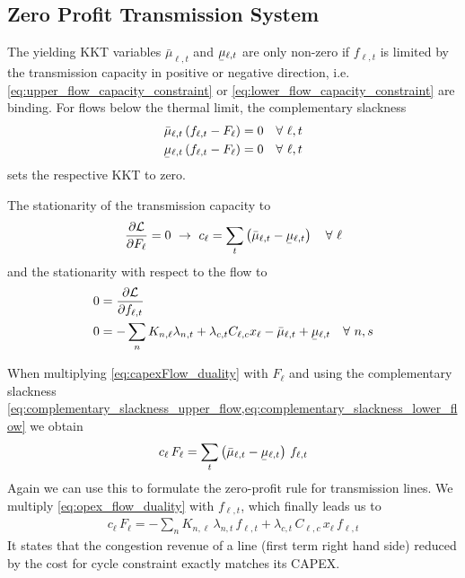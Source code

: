 \documentclass[11pt,twocolumn]{article}
\newcommand{\ubar}[1]{\underaccent{\bar}{#1}}
\newcommand{\Forall}[1]{\hspace{10pt} \forall \,\, #1 }
\newcommand{\pdv}[2]{\frac{\partial #1}{\partial #2}}
\newcommand{\flow}{f_{\ell,t}}
\newcommand{\capacityflow}{F_{\ell}}
\newcommand{\capitalpriceflow}{c_{\ell}}
\newcommand{\mulowerflow}{\ubar{\mu}_{\ell,t}}
\newcommand{\muupperflow}{\bar{\mu}_{\ell,t}}
\newcommand{\lagrangian}{\mathcal{L}}
\newcommand{\lmp}[1][n]{\lambda_{#1,t}}
\newcommand{\incidence}[1][n]{K_{#1,\ell}}
\newcommand{\cycle}{C_{\ell,c}}
\newcommand{\impedance}{x_\ell}
\newcommand{\cycleprice}{\lambda_{c,t}}
\begin{document}
\subsection{Zero Profit Transmission System}
\label{sec:zero_profit_flow}

The yielding KKT variables $\muupperflow$ and $\mulowerflow$ are only non-zero if $\flow$ is limited by the transmission capacity in positive or negative direction, i.e. \cref{eq:upper_flow_capacity_constraint} or \cref{eq:lower_flow_capacity_constraint} are binding. For flows below the thermal limit, the complementary slackness 
\begin{align}
\muupperflow \left( \flow - \capacityflow \right)  &= 0 \Forall{\ell,t}
\label{eq:complementary_slackness_upper_flow} \\
\mulowerflow \left( \flow - \capacityflow \right) &=  0 \Forall{\ell,t}
\label{eq:complementary_slackness_lower_flow} 
\end{align}
sets the respective KKT to zero. 

The stationarity of the transmission capacity to
\begin{align}
\pdv{\lagrangian}{\capacityflow} = 0 \,\, \rightarrow \,\, 
\capitalpriceflow =  \sum_t \left( \muupperflow - \mulowerflow \right) \Forall{\ell}
\label{eq:capexFlow_duality}
\end{align}
and the stationarity with respect to the flow to
\begin{align}
    0 &= \pdv{\lagrangian}{\flow}  \\ 
    0 &= - \sum_n \incidence \lmp  + \cycleprice \cycle \impedance  - \muupperflow + \mulowerflow \Forall{n,s} \label{eq:opex_flow_duality}
\end{align}
    
    
When multiplying \cref{eq:capexFlow_duality} with $\capacityflow$ and using the complementary slackness \cref{eq:complementary_slackness_upper_flow,eq:complementary_slackness_lower_flow} we obtain 
\begin{align}
 \capitalpriceflow \, \capacityflow = \sum_t \left( \muupperflow - \mulowerflow \right)  \, \flow
 \label{eq:capital_price_flow_sum}
\end{align}
Again we can use this to formulate the zero-profit rule for transmission lines. We multiply \cref{eq:opex_flow_duality} with $\flow$, which finally leads us to 
\begin{align}
\capitalpriceflow \, \capacityflow = - \sum_n \incidence\, \lmp\, \flow + \cycleprice\, \cycle\, \impedance\, \flow 
\end{align}
It states that the congestion revenue of a line (first term right hand side) reduced by the cost for cycle constraint exactly matches its CAPEX. 
\end{document}
